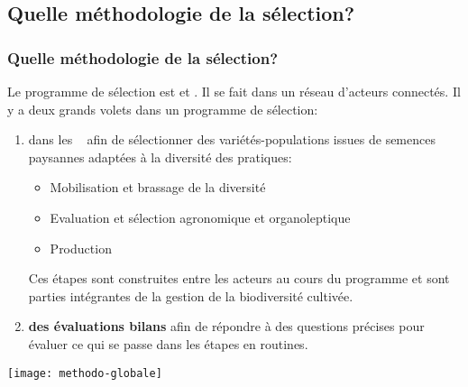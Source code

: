 \subsection{Quelle méthodologie de la sélection?}

\begin{frame}
\frametitle{Quelle méthodologie de la sélection?}

Le programme de sélection est  et .
Il se fait dans un réseau d'acteurs connectés. 
Il y a deux grands volets dans un programme de sélection:

\begin{enumerate}

\item {} dans les \MSPs~ afin de sélectionner des variétés-populations issues de semences paysannes adaptées à la diversité des pratiques:

\begin{itemize}
\item Mobilisation et brassage de la diversité
\item Evaluation et sélection agronomique et organoleptique
\item Production
\end{itemize}

Ces étapes sont construites entre les acteurs au cours du programme et sont parties intégrantes de la gestion de la biodiversité cultivée.

\item \textbf{\color{mln-green}des évaluations bilans} afin de répondre à des questions précises pour évaluer ce qui se passe dans les étapes en routines.

\end{enumerate}

\end{frame}

\begin{frame}
\begin{center}
\texttt{[image: methodo-globale]} \tiny \cite{methodo-globale}
\end{center}
\end{frame}

